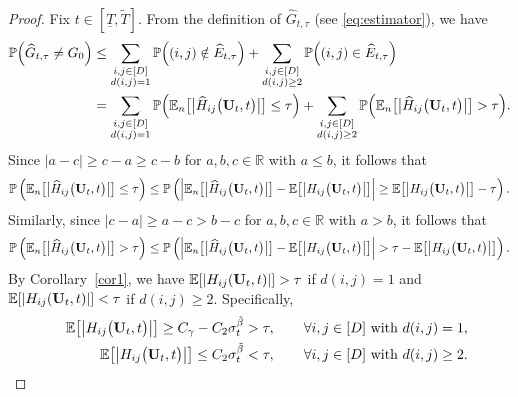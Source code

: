 \documentclass[11pt,a4paper,final]{article}
\numberwithin{equation}{section}
\theoremstyle{remark}
\newcommand{\bU}{{\bf U}}
\newcommand{\bbE}{{\mathbb E}}
\newcommand{\bbR}{{\mathbb R}}
\newcommand{\bbP}{{\mathbb P}}
\newcommand{\be}{\begin{equation}}
\newcommand{\ee}{\end{equation}}
\newcommand{\bean}{\setlength\arraycolsep{1pt}\begin{eqnarray*}}
\newcommand{\eean}{\end{eqnarray*}}
\begin{document}
\begin{proof}

Fix $t \in [\underline{T}, {\widetilde T} ]$.
From the definition of $\widehat G_{t,\tau}$ (see \eqref{eq:estimator}), we have
\be
\begin{split}
\bbP \Big( \widehat G_{t,\tau} \neq G_{0} \Big)
&\leq \sum_{ \substack {i,j \in [D]  \\ d(i,j) = 1} } \bbP \Big(  (i,j) \notin \widehat E_{t,\tau}  \Big) 
+ \sum_{ \substack {i,j \in [D]  \\ d(i,j) \geq 2} } \bbP \Big(  (i,j) \in \widehat E_{t,\tau} \Big) 
\\
& = \sum_{ \substack {i,j \in [D]  \\ d(i,j) = 1 } } \bbP  \Big(  \bbE_{n} \big[  \big\vert \widehat H_{ij} \big( \bU_{t}, t \big)  \big\vert \big]  \leq \tau \Big) 
+ \sum_{  \substack {i,j \in [D]  \\ d(i,j) \geq 2 } } \bbP  \Big(  \bbE_{n} \big[  \big\vert \widehat H_{ij} \big( \bU_{t}, t \big)  \big\vert \big]  > \tau \Big).
\label{eqthm2:t1_t2}
\end{split}
\ee
Since $\vert a-c \vert \geq c - a \geq c - b$ for $a,b,c \in \bbR$ with $a \leq b$, it follows that
\bean
\bbP  \left( \bbE_{n} \big[  \big\vert \widehat H_{ij} \big( \bU_{t} , t \big)  \big\vert \big] \leq \tau \right)
\leq  \bbP \left( \Big\vert \bbE_{n} \big[  \big\vert \widehat H_{ij} \big( \bU_{t} , t \big)  \big\vert \big] - \bbE \big[  \big\vert  H_{ij} \big(  \bU_{t} , t \big)  \big\vert \big] \Big\vert
\geq \bbE \big[  \big\vert  H_{ij} \big( \bU_{t}, t \big)  \big\vert \big]  - \tau
\right).
\eean
Similarly, since $\vert c-a \vert \geq a-c > b - c$ for $a,b,c \in \bbR$ with $a > b$, it follows that
\bean
\bbP  \left( \bbE_{n} \big[  \big\vert \widehat H_{ij} \big( \bU_{t}, t \big)  \big\vert \big] > \tau \right)
\leq  \bbP \left( \Big\vert \bbE_{n} \big[  \big\vert \widehat H_{ij} \big( \bU_{t}, t \big)  \big\vert \big] - \bbE \big[  \big\vert  H_{ij} \big(  \bU_{t}, t \big)  \big\vert \big] \Big\vert
> \tau - \bbE \big[  \big\vert  H_{ij} \big(  \bU_{t}, t \big)  \big\vert \big]
\right).
\eean
By Corollary~\ref{cor1}, we have $\bbE [ \vert H_{ij} (\bU_{t},t) \vert ] > \tau$ if $d(i,j) = 1$ and $\bbE [ \vert H_{ij} (\bU_{t},t) \vert ] < \tau$ if $d(i,j) \geq 2$. 
Specifically,
\bean
&& \bbE \big[  \big\vert  H_{ij} \big(  \bU_{t}, t \big)  \big\vert \big] \geq C_{\gamma} - C_{2} \sigma_{t}^{{\tilde \beta}} > \tau,
\qquad \forall i,j \in [D] \text{ with } d(i,j) = 1,
\\
&&  \bbE \big[  \big\vert  H_{ij} \big(  \bU_{t}, t \big)  \big\vert \big] \leq C_{2} \sigma_{t}^{{\tilde \beta}} < \tau,
\qquad  \forall i,j \in [D] \text{ with } d(i,j) \geq 2.
\eean


\end{proof}
\end{document}
